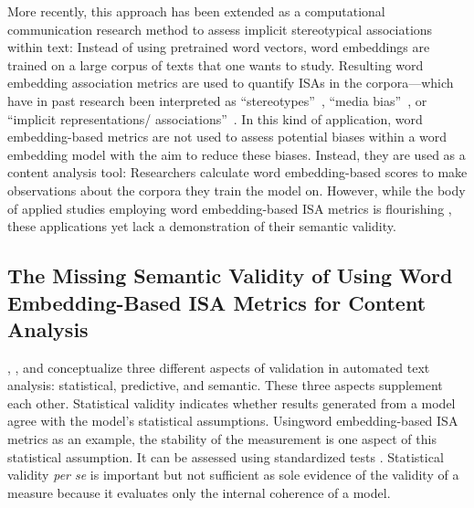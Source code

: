 More recently, this approach has been extended as a computational communication research method to assess implicit stereotypical associations within text: Instead of using pretrained word vectors, word embeddings are trained on a large corpus of texts that one wants to study. Resulting word embedding association metrics are used to quantify ISAs in the corpora---which have in past research been interpreted as ``stereotypes''~\parencite{kroon2021,andrich:2023:GGS,andrich2022leader,azzalini:2025:CI}, ``media bias''~\parencite{sales2019media,curto:2022:AA}, or ``implicit representations/ associations''~\parencite{fu:2023:PRG,mueller:2023:DRN,urman:2022:F}. In this kind of application, word embedding-based metrics are not used to assess potential biases within a word embedding model with the aim to reduce these biases. Instead, they are used as a content analysis tool: Researchers calculate word embedding-based scores to make observations about the corpora they train the model on. However, while the body of applied studies employing word embedding-based ISA metrics is flourishing \parencite[also see,][]{durrheim2023}, these applications yet lack a demonstration of their semantic validity.

\subsection{The Missing Semantic Validity of Using Word Embedding-Based ISA Metrics for Content Analysis}
\textcite{dimaggio:2013:E}, \textcite{quinn:2010:HAP}, and \textcite{Grimmer2013} conceptualize three different aspects of validation in automated text analysis: statistical, predictive, and semantic. These three aspects supplement each other. Statistical validity indicates whether results generated from a model agree with the model's statistical assumptions. Usingword embedding-based ISA metrics as an example, the stability of the measurement is one aspect of this statistical assumption. It can be assessed using standardized tests \parencite[e.g.,][]{spliethover2021bias}. Statistical validity \textit{per se} is important but not sufficient as sole evidence of the validity of a measure because it evaluates only the internal coherence of a model. 

